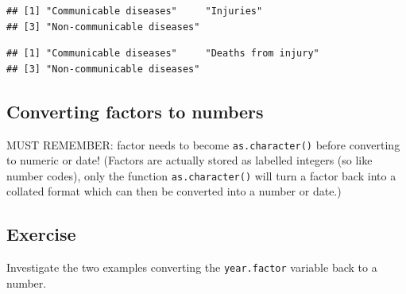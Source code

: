\documentclass[]{book}
\makeatletter
\newenvironment{Shaded}{\begin{snugshade}}{\end{snugshade}}
\newcommand{\KeywordTok}[1]{\textcolor[rgb]{0.13,0.29,0.53}{\textbf{#1}}}
\newcommand{\StringTok}[1]{\textcolor[rgb]{0.31,0.60,0.02}{#1}}
\newcommand{\CommentTok}[1]{\textcolor[rgb]{0.56,0.35,0.01}{\textit{#1}}}
\newcommand{\OperatorTok}[1]{\textcolor[rgb]{0.81,0.36,0.00}{\textbf{#1}}}
\newcommand{\NormalTok}[1]{#1}
\newenvironment{kframe}{%
\medskip{}
\setlength{\fboxsep}{.8em}
 \def\at@end@of@kframe{}%
 \ifinner\ifhmode%
  \def\at@end@of@kframe{\end{minipage}}%
  \begin{minipage}{\columnwidth}%
 \fi\fi%
 \def\FrameCommand##1{\hskip\@totalleftmargin \hskip-\fboxsep
 \colorbox{shadecolor}{##1}\hskip-\fboxsep
     \hskip-\linewidth \hskip-\@totalleftmargin \hskip\columnwidth}%
 \MakeFramed {\advance\hsize-\width
   \@totalleftmargin\z@ \linewidth\hsize
   \@setminipage}}%
 {\par\unskip\endMakeFramed%
 \at@end@of@kframe}
\renewenvironment{Shaded}{\begin{kframe}}{\end{kframe}}
\makeatother
\begin{document}
\begin{Shaded}
\end{Shaded}

\begin{verbatim}
## [1] "Communicable diseases"     "Injuries"                 
## [3] "Non-communicable diseases"
\end{verbatim}

\begin{Shaded}
\end{Shaded}

\begin{verbatim}
## [1] "Communicable diseases"     "Deaths from injury"       
## [3] "Non-communicable diseases"
\end{verbatim}

\subsection{Converting factors to
numbers}\label{converting-factors-to-numbers}

MUST REMEMBER: factor needs to become \texttt{as.character()} before
converting to numeric or date! (Factors are actually stored as labelled
integers (so like number codes), only the function
\texttt{as.character()} will turn a factor back into a collated format
which can then be converted into a number or date.)

\subsection{Exercise}\label{exercise-22}

Investigate the two examples converting the \texttt{year.factor}
variable back to a number.

\begin{Shaded}
\end{Shaded}
\end{document}
